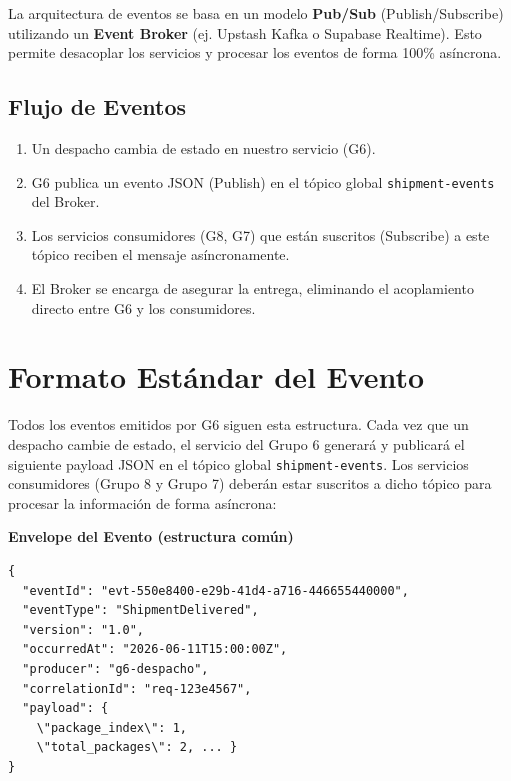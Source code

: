 \documentclass[11pt, a4paper]{article}
\newcommand{\contractheader}[1]{%
  \noindent\colorbox{primary!10}{%
    \parbox{\dimexpr\textwidth-2\fboxsep}{%
      \textbf{\faFileCode\quad #1}%
    }%
  }
  \vspace{0.3cm}
}
\begin{document}
La arquitectura de eventos se basa en un modelo \textbf{Pub/Sub} (Publish/Subscribe) utilizando un \textbf{Event Broker} (ej. Upstash Kafka o Supabase Realtime). 
Esto permite desacoplar los servicios y procesar los eventos de forma 100\% asíncrona.

\subsection{Flujo de Eventos}

\begin{enumerate}[noitemsep]
  \item Un despacho cambia de estado en nuestro servicio (G6).
  \item G6 publica un evento JSON (Publish) en el tópico global \texttt{shipment-events} del Broker.
  \item Los servicios consumidores (G8, G7) que están suscritos (Subscribe) a este tópico reciben el mensaje asíncronamente.
  \item El Broker se encarga de asegurar la entrega, eliminando el acoplamiento directo entre G6 y los consumidores.
\end{enumerate}


\section{Formato Estándar del Evento}
\label{sec:formato-evento}

Todos los eventos emitidos por G6 siguen esta estructura. Cada vez que un despacho cambie de estado, el servicio del Grupo 6 generará y publicará el siguiente payload JSON en el tópico global \texttt{shipment-events}. Los servicios consumidores (Grupo 8 y Grupo 7) deberán estar suscritos a dicho tópico para procesar la información de forma asíncrona:

\contractheader{Envelope del Evento (estructura común)}

\begin{lstlisting}
{
  "eventId": "evt-550e8400-e29b-41d4-a716-446655440000",
  "eventType": "ShipmentDelivered",
  "version": "1.0",
  "occurredAt": "2026-06-11T15:00:00Z",
  "producer": "g6-despacho",
  "correlationId": "req-123e4567",
  "payload": {
    \"package_index\": 1,
    \"total_packages\": 2, ... }
}
\end{lstlisting}
\end{document}
